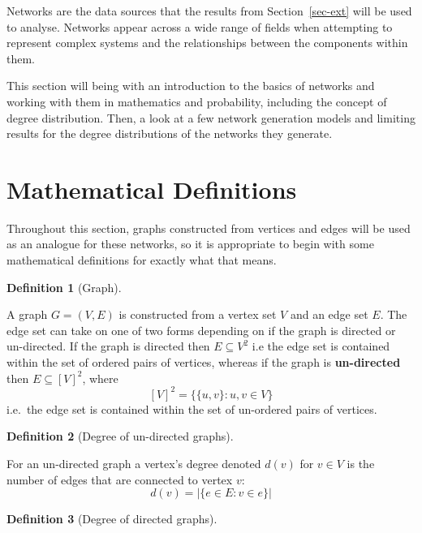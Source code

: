 \documentclass[
  10pt,
  a4paper,
]{scrreprt}
\theoremstyle{plain}
\theoremstyle{definition}
\newtheorem{definition}{Definition}[section]
\theoremstyle{plain}
\theoremstyle{remark}
\begin{document}
{Networks are the data sources that the results from
Section~\ref{sec-ext} will be used to analyse. Networks appear across a
wide range of fields when attempting to represent complex systems and
the relationships between the components within them.

This section will being with an introduction to the basics of networks
and working with them in mathematics and probability, including the
concept of degree distribution. Then, a look at a few network generation
models and limiting results for the degree distributions of the networks
they generate.

\hypertarget{mathematical-definitions}{%
\section{Mathematical Definitions}\label{mathematical-definitions}}

Throughout this section, graphs constructed from vertices and edges will
be used as an analogue for these networks, so it is appropriate to begin
with some mathematical definitions for exactly what that means.

\begin{definition}[Graph]\protect\hypertarget{def-net}{}\label{def-net}

A graph \(G = (V,E)\) is constructed from a vertex set \(V\) and an edge
set \(E\). The edge set can take on one of two forms depending on if the
graph is directed or un-directed. If the graph is directed then
\(E\subseteq V^2\) i.e the edge set is contained within the set of
ordered pairs of vertices, whereas if the graph is \textbf{un-directed}
then \(E\subseteq [V]^2\), where \[
[V]^2 = \{\{u,v\}:u,v\in V\}
\] i.e.~the edge set is contained within the set of un-ordered pairs of
vertices.

\end{definition}

\begin{definition}[Degree of un-directed
graphs]\protect\hypertarget{def-deg}{}\label{def-deg}

For an un-directed graph a vertex's degree denoted \(d(v)\) for
\(v\in V\) is the number of edges that are connected to vertex \(v\): \[
d(v) = |\{e\in E : v \in e\}|
\]

\end{definition}

\begin{definition}[Degree of directed
graphs]\protect\hypertarget{def-dirdeg}{}\label{def-dirdeg}


\end{definition}}
\end{document}
